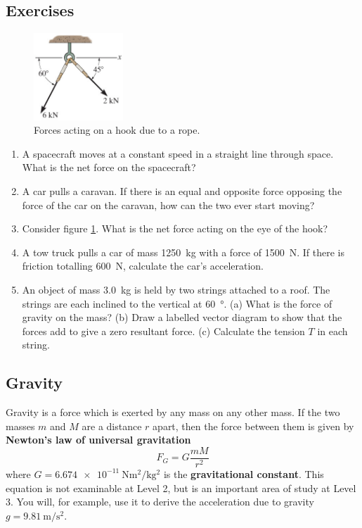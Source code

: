 \documentclass[a4paper]{amsbook}
\newcommand\capcite[1]{}
\begin{document}
\subsection{Exercises}
\begin{figure}
  \centering
  \includegraphics[width=0.3\textwidth]{resultantex}
  \caption{Forces acting on a hook due to a rope. \capcite{http://s3.amazonaws.com/answer-board-image/2ace727f-4377-4440-82e1-17b6311a624b.bmp}\label{fig:resultantex}}
\end{figure}
\begin{enumerate}
  \item A spacecraft moves at a constant speed in a straight line through space. What is the net force on the spacecraft?
  \item A car pulls a caravan. If there is an equal and opposite force opposing the force of the car on
        the caravan, how can the two ever start moving?
  \item Consider figure \ref{fig:resultantex}. What is the net force acting on the eye of the hook?
  \item A tow truck pulls a car of mass \SI{1250}{\kilo\gram} with a force of \SI{1500}{\newton}. If there is
        friction totalling \SI{600}{\newton}, calculate the car's acceleration.
  \item An object of mass \SI{3.0}{\kilo\gram} is held by two strings attached to a roof. The strings are
        each inclined to the vertical at \SI{60}{\degree}. (a) What is the force of gravity on the mass?
        (b) Draw a labelled vector diagram to show that the forces add to give a zero resultant force. (c)
        Calculate the tension $ T $ in each string.
\end{enumerate}

\subsection{Gravity}
Gravity is a force which is exerted by any mass on any other mass. If the two masses $ m $ and $ M $ are a distance $ r $ apart,
then the force between them is given by \textbf{Newton's law of universal gravitation}
\begin{equation}
  F_G = G \frac{mM}{r^2}
\end{equation}
where $ G = \SI{6.674e-11}{\newton\metre\squared\per\kilo\gram\squared} $ is the \textbf{gravitational constant}. This equation
is not examinable at Level 2, but is an important area of study at Level 3. You will, for example, use it to derive the acceleration
due to gravity $ g = \SI{9.81}{\metre\per\second\squared} $.
\end{document}
